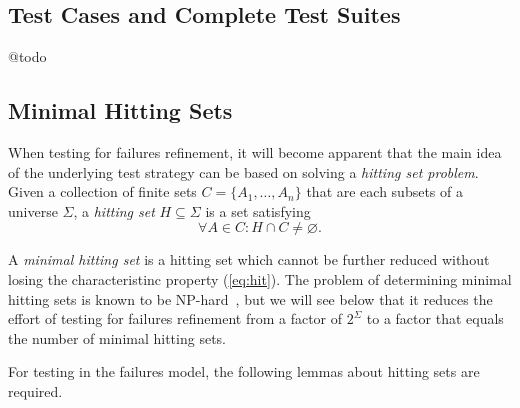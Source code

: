 \subsection{Test Cases and Complete Test Suites}
\label{sec:cspcompletedef}

@todo




\subsection{Minimal Hitting Sets}
\label{sec:hit}

When testing for failures refinement, it will become apparent that the main idea of the underlying test strategy can be based on solving a \emph{hitting set problem}. Given a collection of finite sets $C = \{ A_1,\dots,A_n\}$ that are each subsets of a universe $\Sigma$, a \emph{hitting set} $H\subseteq\Sigma$ is a set satisfying
\begin{equation}
\label{eq:hit}
\forall A\in C: H\cap C \neq\varnothing.
\end{equation}

A \emph{minimal hitting set} is a hitting set which cannot be further reduced without losing 
the characteristinc property (\ref{eq:hit}). The problem of determining minimal hitting sets is known to be NP-hard~\cite{Book1975-BOOKRM}, but we will see below that it reduces 
the effort of testing for failures refinement from a factor of $2^\Sigma$ to a factor that equals the number of minimal hitting sets.

For testing in the failures model, the following lemmas about hitting sets are required.

